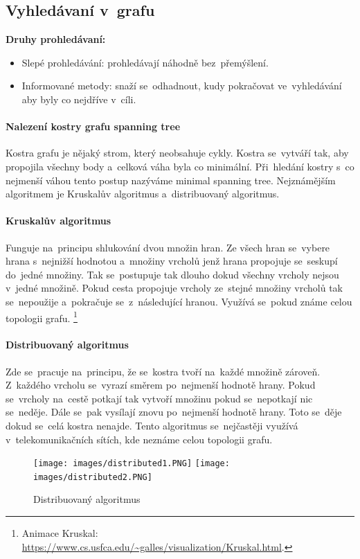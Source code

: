 \subsection{Vyhledávaní v~grafu}

\textbf{Druhy prohledávaní:}
\begin{itemize}
	\item Slepé prohledávání: prohledávají náhodně bez~přemýšlení.
	\item Informované metody: snaží se~odhadnout, kudy pokračovat ve~vyhledávání aby byly co nejdříve v~cíli.
\end{itemize}

\paragraph{Nalezení kostry grafu spanning tree} Kostra grafu je nějaký strom, který neobsahuje cykly. Kostra se~vytváří tak, aby propojila všechny body a~celková váha byla co minimální. Při~hledání kostry s~co nejmenší váhou tento postup nazýváme minimal spanning tree. Nejznámějším algoritmem je Kruskalův algoritmus a~distribuovaný algoritmus.

\paragraph{Kruskalův algoritmus} Funguje na~principu shlukování dvou množin hran. Ze všech hran se~vybere hrana s~nejnižší hodnotou a~množiny vrcholů jenž hrana propojuje se~seskupí do~jedné množiny. Tak se~postupuje tak dlouho dokud všechny vrcholy nejsou v~jedné množině. Pokud cesta propojuje vrcholy ze~stejné množiny vrcholů tak se~nepoužije a~pokračuje se~z~následující hranou. Využívá se~pokud známe celou topologii grafu.%
\footnote{Animace Kruskal: \url{https://www.cs.usfca.edu/~galles/visualization/Kruskal.html}.}

\paragraph{Distribuovaný algoritmus} Zde se~pracuje na~principu, že se~kostra tvoří na~každé množině zároveň. Z~každého vrcholu se~vyrazí směrem po~nejmenší hodnotě hrany. Pokud se~vrcholy na~cestě potkají tak vytvoří množinu pokud se~nepotkají nic se~neděje. Dále se~pak vysílají znovu po~nejmenší hodnotě hrany. Toto se~děje dokud se~celá kostra nenajde. Tento algoritmus se~nejčastěji využívá v~telekomunikačních sítích, kde neznáme celou topologii grafu.

\begin{figure}[ht]
	\centering
	\texttt{[image: images/distributed1.PNG]}
	\texttt{[image: images/distributed2.PNG]}
	\caption{Distribuovaný algoritmus}
	\label{distributed}
\end{figure}

